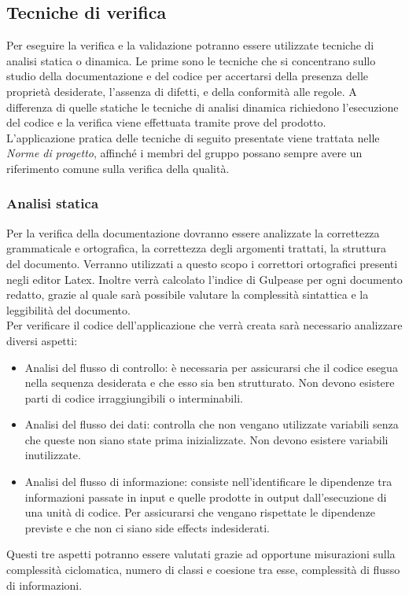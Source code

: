 \subsection{Tecniche di verifica}
Per eseguire la verifica e la validazione potranno essere utilizzate tecniche di analisi statica o dinamica. Le prime sono le tecniche che si concentrano sullo studio della documentazione e del codice per accertarsi della presenza delle proprietà desiderate, l'assenza di difetti, e della conformità alle regole. A differenza di quelle statiche le tecniche di analisi dinamica richiedono l'esecuzione del codice e la verifica viene effettuata tramite prove del prodotto.\\
L'applicazione pratica delle tecniche di seguito presentate viene trattata nelle \textit{Norme di progetto}, affinché i membri del gruppo possano sempre avere un riferimento comune sulla verifica della qualità.
\subsubsection{Analisi statica}
Per la verifica della documentazione dovranno essere analizzate la correttezza grammaticale e ortografica, la correttezza degli argomenti trattati, la struttura del documento. Verranno utilizzati a questo scopo i correttori ortografici presenti negli editor Latex. Inoltre verrà calcolato l'indice di Gulpease per ogni documento redatto, grazie al quale sarà possibile valutare la complessità sintattica e la leggibilità del documento.\\
Per verificare il codice dell'applicazione che verrà creata sarà necessario analizzare diversi aspetti:
\begin{itemize}
\item Analisi del flusso di controllo: è necessaria per assicurarsi che il codice esegua nella sequenza desiderata e che esso sia ben strutturato. Non devono esistere parti di codice irraggiungibili o interminabili.
\item Analisi del flusso dei dati: controlla che non vengano utilizzate variabili senza che queste non siano state prima inizializzate. Non devono esistere variabili inutilizzate. 
\item Analisi del flusso di informazione: consiste nell'identificare le dipendenze tra informazioni passate in input e quelle prodotte in output dall’esecuzione di una unità di codice. Per assicurarsi che vengano rispettate le dipendenze previste e che non ci siano side effects indesiderati.
\end{itemize}
Questi tre aspetti potranno essere valutati grazie ad opportune misurazioni sulla complessità ciclomatica, numero di classi e coesione tra esse, complessità di flusso di informazioni.
\newpage
